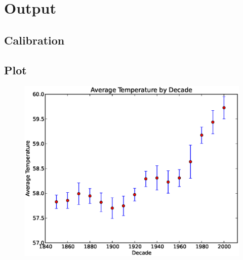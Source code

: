 \documentclass[12pt,a4paper]{article} %
\begin{document}
\section{Output}
\subsection{Calibration}
\paragraph{}


\subsection{Plot}
\begin{figure}[b]
\centering
 \includegraphics[width=\textwidth]{../img/temp_plot.ps}
\end{figure}

%
%
% 
 
%
\end{document}
